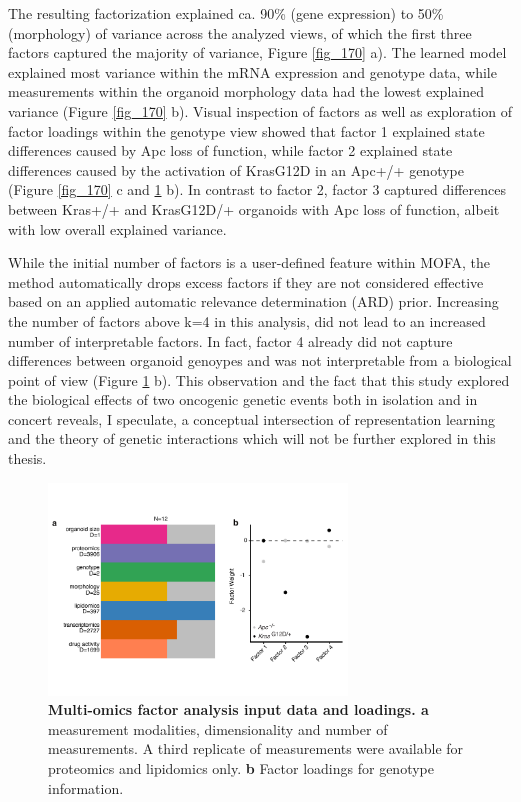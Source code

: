 \begin{flushleft}
\smallbreak
The resulting factorization explained ca. 90\% (gene expression) to 50\% (morphology) of variance across the analyzed views, of which the first three factors captured the majority of variance, Figure \ref{fig_170} a). The learned model explained most variance within the mRNA expression and genotype data, while measurements within the organoid morphology data had the lowest explained variance (Figure \ref{fig_170} b). Visual inspection of factors as well as exploration of factor loadings within the genotype view showed that factor 1 explained state differences caused by Apc loss of function, while factor 2 explained state differences caused by the activation of KrasG12D in an Apc+/+ genotype (Figure \ref{fig_170} c and \ref{fig_180} b). In contrast to factor 2, factor 3 captured differences between Kras+/+ and KrasG12D/+ organoids with Apc loss of function, albeit with low overall explained variance. 

\smallbreak
While the initial number of factors is a user-defined feature within MOFA, the method automatically drops excess factors if they are not considered effective based on an applied automatic relevance determination (ARD) prior. Increasing the number of factors above k=4 in this analysis, did not lead to an increased number of interpretable factors. In fact, factor 4 already did not capture differences between organoid genoypes and was not interpretable from a biological point of view (Figure \ref{fig_180} b). This observation and the fact that this study explored the biological effects of two oncogenic genetic events both in isolation and in concert reveals, I speculate, a conceptual intersection of representation learning  and the theory of genetic interactions which will not be further explored in this thesis. 

\begin{figure}[h!]
\centering
\includegraphics[width=300,
                height=\textheight,
                keepaspectratio]{figures/adenomaprofiling/pdf/fig_1_8.pdf}
\caption{\textbf{Multi-omics factor analysis input data and loadings. a} measurement modalities, dimensionality and number of measurements. A third replicate of measurements were available for proteomics and lipidomics only. \textbf{b} Factor loadings for genotype information.} 
\label{fig_180}
\end{figure}
\bigbreak


\end{flushleft}
